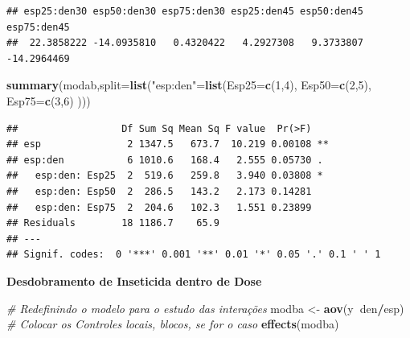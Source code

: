 \documentclass[
]{book}
\newenvironment{Shaded}{\begin{snugshade}}{\end{snugshade}}
\newcommand{\CommentTok}[1]{\textcolor[rgb]{0.56,0.35,0.01}{\textit{#1}}}
\newcommand{\DataTypeTok}[1]{\textcolor[rgb]{0.13,0.29,0.53}{#1}}
\newcommand{\DecValTok}[1]{\textcolor[rgb]{0.00,0.00,0.81}{#1}}
\newcommand{\KeywordTok}[1]{\textcolor[rgb]{0.13,0.29,0.53}{\textbf{#1}}}
\newcommand{\NormalTok}[1]{#1}
\newcommand{\OperatorTok}[1]{\textcolor[rgb]{0.81,0.36,0.00}{\textbf{#1}}}
\newcommand{\StringTok}[1]{\textcolor[rgb]{0.31,0.60,0.02}{#1}}
\begin{document}
\begin{verbatim}
## esp25:den30 esp50:den30 esp75:den30 esp25:den45 esp50:den45 esp75:den45 
##  22.3858222 -14.0935810   0.4320422   4.2927308   9.3733807 -14.2964469
\end{verbatim}

\begin{Shaded}
\begin{Highlighting}[]
\KeywordTok{summary}\NormalTok{(modab,}\DataTypeTok{split=}\KeywordTok{list}\NormalTok{(}\StringTok{"esp:den"}\NormalTok{=}\KeywordTok{list}\NormalTok{(}\DataTypeTok{Esp25=}\KeywordTok{c}\NormalTok{(}\DecValTok{1}\NormalTok{,}\DecValTok{4}\NormalTok{), }
                                         \DataTypeTok{Esp50=}\KeywordTok{c}\NormalTok{(}\DecValTok{2}\NormalTok{,}\DecValTok{5}\NormalTok{),}
                                         \DataTypeTok{Esp75=}\KeywordTok{c}\NormalTok{(}\DecValTok{3}\NormalTok{,}\DecValTok{6}\NormalTok{)}
\NormalTok{                                         ))) }
\end{Highlighting}
\end{Shaded}

\begin{verbatim}
##                  Df Sum Sq Mean Sq F value  Pr(>F)   
## esp               2 1347.5   673.7  10.219 0.00108 **
## esp:den           6 1010.6   168.4   2.555 0.05730 . 
##   esp:den: Esp25  2  519.6   259.8   3.940 0.03808 * 
##   esp:den: Esp50  2  286.5   143.2   2.173 0.14281   
##   esp:den: Esp75  2  204.6   102.3   1.551 0.23899   
## Residuals        18 1186.7    65.9                   
## ---
## Signif. codes:  0 '***' 0.001 '**' 0.01 '*' 0.05 '.' 0.1 ' ' 1
\end{verbatim}

\textbf{Desdobramento de Inseticida dentro de Dose}

\begin{Shaded}
\begin{Highlighting}[]
\CommentTok{# Redefinindo o modelo para o estudo das interações}
\NormalTok{modba <-}\StringTok{ }\KeywordTok{aov}\NormalTok{(y}\OperatorTok{~}\NormalTok{den}\OperatorTok{/}\NormalTok{esp) }\CommentTok{# Colocar os Controles locais, blocos, se for o caso}
\KeywordTok{effects}\NormalTok{(modba)}
\end{Highlighting}
\end{Shaded}
\end{document}

